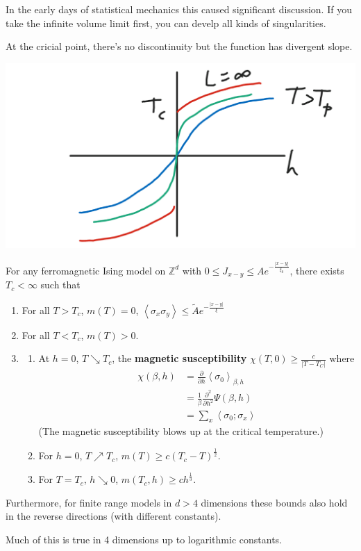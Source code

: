 
In the early days of statistical mechanics this caused significant discussion. If you take the infinite volume limit first, you can develp all kinds of singularities.

At the cricial point, there's no discontinuity but the function has divergent slope. 

\begin{center}\includegraphics[scale=.25]{images/4-26-2}\end{center}

\begin{theorem}
For any ferromagnetic Ising model on $\mathbb{Z}^d$ with $0 \le J_{x-y} \le Ae^{-\frac{|x-y|}{\xi_0}}$, there exists $T_c<\infty$ such that 
\begin{enumerate}
\item
For all $T>T_c$, $m(T)=0$, $\left\langle {\sigma_x\sigma_y}\right\rangle\le \widetilde{A} e^{-\frac{|x-y|}{\xi}}$
\item
For all $T<T_c$, $m(T)>0$. 
\item
\begin{enumerate}
\item
At $h=0$, $T\searrow T_c$, the \textbf{magnetic susceptibility} $\chi(T,0)\ge \frac{c}{|T-T_C|}$ where 
\begin{align}
\chi(\beta,h) &= \frac{\partial}{\partial h} \left\langle {\sigma_0}\right\rangle_{\beta, h} \\
&=\frac{1}{\beta}\frac{\partial^2 }{\partial {h}^2}\Psi(\beta, h)\\
&=\sum_x \left\langle {\sigma_0;\sigma_x}\right\rangle
\end{align}
(The {magnetic susceptibility} blows up at the critical temperature.)
\item
For $h=0$, $T\nearrow T_c$, $m(T) \ge c(T_c-T)^{\frac{1}{2}}$.
\item
For $T=T_c$, $h\searrow 0$, $m(T_c,h) \ge ch^{\frac{1}{3}}$.
\end{enumerate}
\end{enumerate}
Furthermore, for finite range models in $d>4$ dimensions these bounds also hold in the reverse directions (with different constants).
\end{theorem}
Much of this is true in 4 dimensions up to logarithmic constants.

